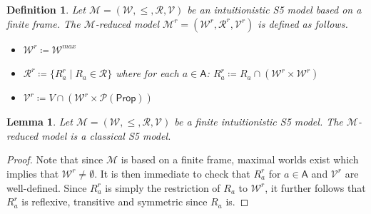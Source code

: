 \documentclass{myifcolog}
\newcommand\Prop {\mathsf{Prop}}
\newcommand\A{\mathsf{A}}
\newcommand{\agi}{a}
\newcommand{\fw}{\mathcal{M}}
\newcommand{\W}{\mathcal{W}}
\newcommand{\rel}{\mathcal{R}}
\newcommand{\V}{\mathcal{V}}
\newtheorem{definition}[theorem]{Definition}
\newtheorem{lemma}[theorem]{Lemma}
\numberwithin{theorem}{section}
\begin{document}
\begin{definition}
    Let $\fw=(\W, \leq, \rel, \V)$ be an intuitionistic S5 model based on a finite frame. The \emph{$\fw$-reduced model} $\fw^r =(\W^r, \rel^r, \V^r)$ is defined as follows.
    \begin{itemize}
        \item $\W^r \coloneqq \W^{max}$
        \item $\rel^r \coloneqq \{R_\agi^r \mid R_\agi \in \rel\}$ where for each $\agi \in \A$: $R_\agi^r \coloneqq R_\agi \cap (\W^r \times \W^r)$
       
        \item $\V^r \coloneqq V \cap (\W^r \times \mathcal{P}(\Prop))$
    \end{itemize}
\end{definition}


\begin{lemma}
    Let $\fw=(\W, \leq, \rel, \V)$ be a finite intuitionistic S5 model. The $\fw$-reduced model is a classical S5 model.
\end{lemma}
\begin{proof}
    Note that since $\fw$ is based on a finite frame, maximal worlds exist which implies that $\W^r \not = \emptyset$. It is then immediate to check that $R_\agi^r$ for $\agi \in \A$ and $\V^r$ are well-defined. Since $R_\agi^r$ is simply the restriction of $R_\agi$ to $\W^r$, it further follows that $R_\agi^r$ is reflexive, transitive and symmetric since $R_\agi$ is.
\end{proof}
\end{document}
